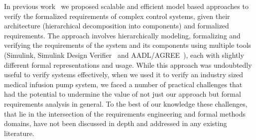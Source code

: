 In previous work~\cite{hilt2013, req2code, ICCPS2014} we proposed scalable and efficient model based approaches to verify the formalized requirements of complex control systems, given their architecture (hierarchical decomposition into components) and formalized requirements. The approach involves hierarchically modeling, formalizing and verifying the requirements of the system and its components using multiple tools (Simulink, Simulink Design Verifier~\cite{SimulinkDesignVerifier} and AADL/AGREE~\cite{NFM2012:CoGaMiWhLaLu}), each with slightly different formal representations and usage. While this approach was undoubtedly useful to verify systems effectively, when we used it to verify an industry sized medical infusion pump system, we faced a number of practical challenges that had the potential to undermine the value of not just our approach but formal requirements analysis in general. To the best of our knowledge these challenges, that lie in the intersection of the requirements engineering and formal methods domains, have not been discussed in depth and addressed in any existing literature.

